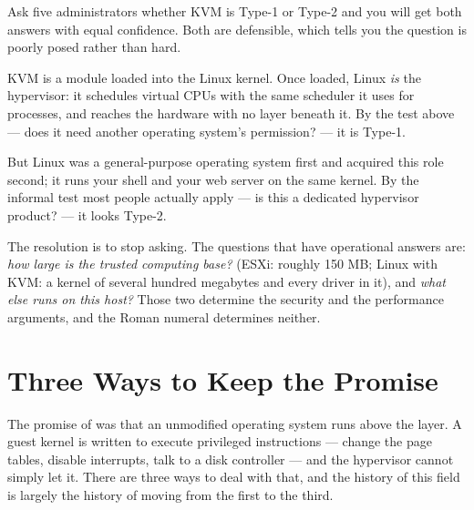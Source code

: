 \begin{conceptbox}
Ask five administrators whether KVM is Type-1 or Type-2 and you will get both
answers with equal confidence. Both are defensible, which tells you the
question is poorly posed rather than hard.

\smallskip
KVM is a module loaded into the Linux kernel. Once loaded, Linux \emph{is} the
hypervisor: it schedules virtual CPUs with the same scheduler it uses for
processes, and reaches the hardware with no layer beneath it. By the test above
--- does it need another operating system's permission? --- it is Type-1.

\smallskip
But Linux was a general-purpose operating system first and acquired this role
second; it runs your shell and your web server on the same kernel. By the
informal test most people actually apply --- is this a dedicated hypervisor
product? --- it looks Type-2.

\smallskip
The resolution is to stop asking. The questions that have operational answers
are: \emph{how large is the trusted computing base?} (ESXi: roughly 150 MB;
Linux with KVM: a kernel of several hundred megabytes and every driver in it),
and \emph{what else runs on this host?} Those two determine the security and
the performance arguments, and the Roman numeral determines neither.
\end{conceptbox}

\section{Three Ways to Keep the Promise}

The promise of  was that an unmodified operating system runs above
the layer. A guest kernel is written to execute privileged instructions ---
change the page tables, disable interrupts, talk to a disk controller --- and
the hypervisor cannot simply let it. There are three ways to deal with that,
and the history of this field is largely the history of moving from the first
to the third.


